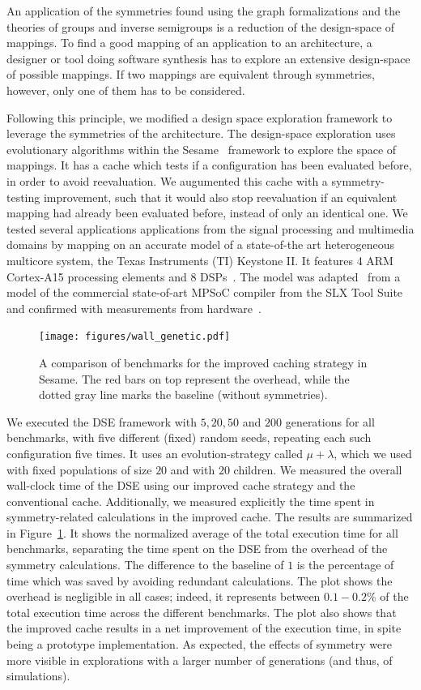 \documentclass[sigplan,10pt]{acmart}
\begin{document}
An application of the symmetries found using the graph formalizations and the theories of groups and inverse semigroups is a reduction of the design-space of mappings. 
To find a good mapping of an application to an architecture, a designer or tool doing software synthesis has to explore an extensive design-space of possible mappings. 
If two mappings are equivalent through symmetries, however, only one of them has to be considered.

Following this principle, we modified a design space exploration framework to leverage the symmetries of the architecture. The design-space exploration uses evolutionary algorithms within the Sesame~\cite{sesame} framework to explore the space of mappings. 
It has a cache which tests if a configuration has been evaluated before, in order to avoid reevaluation.
We augumented this cache with a symmetry-testing improvement, such that it would also stop reevaluation if an equivalent mapping had already been evaluated before, instead of only an identical one.
We tested several applications applications from the signal processing and multimedia domains by mapping on an accurate model of a state-of-the art heterogeneous multicore system, the Texas Instruments (TI) Keystone II. It features 4 ARM Cortex-A15 processing elements and 8 DSPs~\cite{keystone2_whitepaper}. 
The model was adapted~\cite{goens_mcsoc16} from a model of the commercial state-of-art MPSoC compiler from the SLX Tool Suite and confirmed with measurements from hardware~\cite{odendahl2013split}.

\begin{figure}
	\centering
	\texttt{[image: figures/wall\_genetic.pdf]}
	\caption{A comparison of benchmarks for the improved caching strategy in Sesame. The red bars on top represent the overhead, while the dotted gray line marks the baseline (without symmetries). }
	\label{fig:genetic_algorithms}
\end{figure}

We executed the DSE framework with $5, 20, 50$ and $200$ generations for all benchmarks, with five different (fixed) random seeds, repeating each such configuration five times.
It uses an evolution-strategy called $\mu + \lambda$, which we used with fixed populations of size $20$ and with $20$ children.
We measured the overall wall-clock time of the DSE using our improved cache strategy and the conventional cache. Additionally, we
measured explicitly the time spent in symmetry-related calculations in the improved cache. The results are summarized in Figure~\ref{fig:genetic_algorithms}.
It shows the normalized average of the total execution time for all benchmarks, separating the time spent on the DSE from the overhead of the symmetry calculations. 
The difference to the baseline of $1$ is the percentage of time which was saved by avoiding redundant calculations.
The plot shows the overhead is negligible in all cases; indeed, it represents between $0.1-0.2 \%$ of the total execution time across the different benchmarks.
The plot also shows that the improved cache results in a net improvement of the execution time, in spite being a prototype implementation. 
As expected, the effects of symmetry were more visible in explorations with a larger number of generations (and thus, of simulations).
\end{document}
